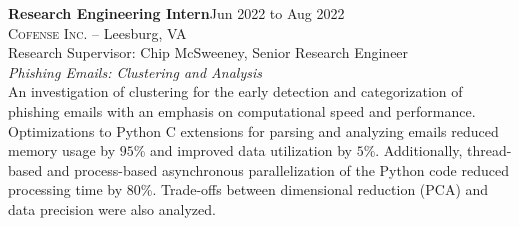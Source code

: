 \documentclass[hidelinks, 10pt]{article}
\def\contentblockspacing{2.5mm}     %
\begin{document}
\vspace{\contentblockspacing}

\begin{minipage}[ct]{0.9\linewidth}
    \textbf{Research Engineering Intern}\hfill Jun 2022 to Aug 2022\\
    \textsc{Cofense Inc.} -- Leesburg, VA\\
    Research Supervisor: Chip McSweeney, Senior Research Engineer\vspace{1mm}\\
    {\textit{Phishing Emails: Clustering and Analysis}}\\
    An investigation of clustering for the early detection and categorization of
    phishing emails with an emphasis on computational speed and performance.  Optimizations to Python C extensions for parsing and analyzing
    emails reduced memory usage by $95$\% and improved data utilization by $5$\%. Additionally, thread-based and process-based asynchronous
    parallelization of the Python code reduced processing time by $80$\%. Trade-offs between dimensional reduction (PCA) and data precision
    were also analyzed.
\end{minipage}

\vspace{\contentblockspacing}
\end{document}
